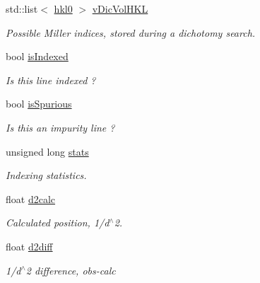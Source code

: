 \begin{DoxyCompactItemize}
std\+::list$<$ \mbox{\hyperlink{struct_obj_cryst_1_1_peak_list_1_1hkl0}{hkl0}} $>$ \mbox{\hyperlink{struct_obj_cryst_1_1_peak_list_1_1hkl_aac462f11d462e446b70a008118ee979a}{v\+Dic\+Vol\+H\+KL}}
\begin{DoxyCompactList}\small\item\em Possible Miller indices, stored during a dichotomy search. \end{DoxyCompactList}\item 
\mbox{\label{struct_obj_cryst_1_1_peak_list_1_1hkl_ac326ec57ba6dd5026512ddb9b9d317c8}} 
bool \mbox{\hyperlink{struct_obj_cryst_1_1_peak_list_1_1hkl_ac326ec57ba6dd5026512ddb9b9d317c8}{is\+Indexed}}
\begin{DoxyCompactList}\small\item\em Is this line indexed ? \end{DoxyCompactList}\item 
\mbox{\label{struct_obj_cryst_1_1_peak_list_1_1hkl_a2e7a78636f1ece663db539279ac03837}} 
bool \mbox{\hyperlink{struct_obj_cryst_1_1_peak_list_1_1hkl_a2e7a78636f1ece663db539279ac03837}{is\+Spurious}}
\begin{DoxyCompactList}\small\item\em Is this an impurity line ? \end{DoxyCompactList}\item 
\mbox{\label{struct_obj_cryst_1_1_peak_list_1_1hkl_a39d25f8e470547a4da7a9e1d3cf9a4fc}} 
unsigned long \mbox{\hyperlink{struct_obj_cryst_1_1_peak_list_1_1hkl_a39d25f8e470547a4da7a9e1d3cf9a4fc}{stats}}
\begin{DoxyCompactList}\small\item\em Indexing statistics. \end{DoxyCompactList}\item 
\mbox{\label{struct_obj_cryst_1_1_peak_list_1_1hkl_a16036f6dea4f34c7715bafa41e08d913}} 
float \mbox{\hyperlink{struct_obj_cryst_1_1_peak_list_1_1hkl_a16036f6dea4f34c7715bafa41e08d913}{d2calc}}
\begin{DoxyCompactList}\small\item\em Calculated position, 1/d$^\wedge$2. \end{DoxyCompactList}\item 
\mbox{\label{struct_obj_cryst_1_1_peak_list_1_1hkl_a66ae3d76c7c2173e27a142ebfcb99162}} 
float \mbox{\hyperlink{struct_obj_cryst_1_1_peak_list_1_1hkl_a66ae3d76c7c2173e27a142ebfcb99162}{d2diff}}
\begin{DoxyCompactList}\small\item\em 1/d$^\wedge$2 difference, obs-\/calc \end{DoxyCompactList}\end{DoxyCompactItemize}


